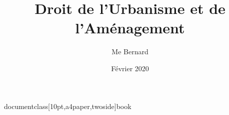 documentclass[10pt,a4paper,twoside]{book}
\usepackage[utf8]{inputenc}
\usepackage[T1]{fontenc}
\usepackage{graphicx}
\usepackage{eurosym}
\usepackage{chemist}
\usepackage{enumitem}
\usepackage[french]{babel}
\usepackage{hyperref}

\author{Me Bernard }
\title{Droit de l'Urbanisme et de l'Aménagement}
\date{Février 2020}

\newcommand*{\siecle}[1]{\textsc{#1}\ieme{}~siècle}
\newcommand*{\nom}[1]{\textsc{#1}}
\newcommand*{\pourcent}[1]{\nombre{#1}~\%}
\newcommand*{\montant}[1]{\nombre{#1}~\euro}
\newcommand*{\metreCarre}{m\up{2}}
\newcommand*{\prixSurface}[1]{\montant{#1}/m\up{2}} 
\newcommand*{\dioxydeDeCarbone}{\chemform{CO_2}}





	\maketitle
	
	
	
	
	
	
	
	
		
	\tableofcontents
	
